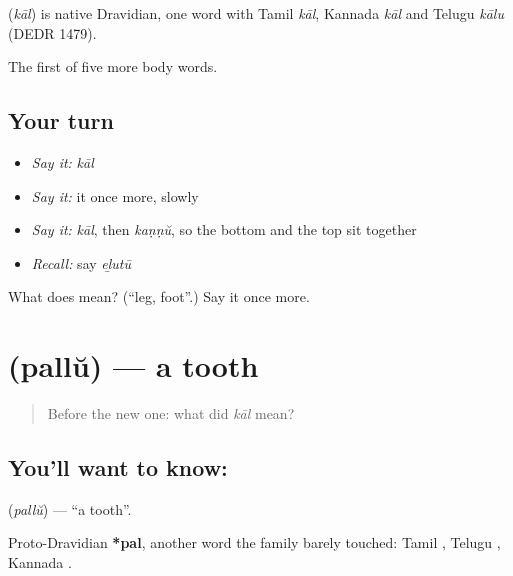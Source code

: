 \begin{cousinweb}
\textbf{} (\emph{kāl}) is native Dravidian, one word with Tamil \emph{kāl}, Kannada \emph{kāl} and Telugu \emph{kālu} (DEDR 1479).
\end{cousinweb}

\begin{grammarlens}[title={What you've built}]
The first of five more body words.
\end{grammarlens}

\subsection*{Your turn}
\begin{itemize}
\raggedright
  \item \emph{Say it:} \emph{kāl}
  \item \emph{Say it:} it once more, slowly
  \item \emph{Say it:} \emph{kāl}, then \emph{kaṇṇŭ}, so the bottom and the top sit together
  \item \emph{Recall:} say \emph{eḻutū}
\end{itemize}

\begin{tcolorbox}[breakable,colback=teal!4,colframe=teal!35!black,title={Before you move on}]
What does  mean? (\textquotedblleft{}leg, foot\textquotedblright{}.) Say it once more.
\end{tcolorbox}
\section[\texorpdfstring{\ml{പല്ല്} (pallŭ)}{പല്ല് (pallŭ)}]{ (pallŭ) — a tooth}

\label{lesson:ML-C47-tooth}



\begin{quote}
Before the new one: what did \emph{kāl} mean?
\end{quote}

\subsection*{You'll want to know: }
\textbf{} (\emph{pallŭ}) — \textquotedblleft{}a tooth\textquotedblright{}.

Proto-Dravidian \textbf{*pal}, another word the family barely touched: Tamil , Telugu , Kannada .

